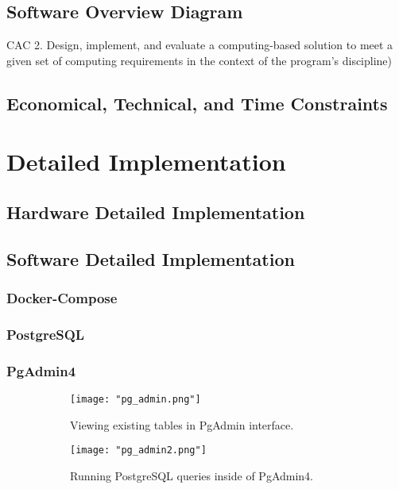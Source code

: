 \documentclass{article}
\begin{document}
\subsection{Software Overview Diagram} 
CAC 2. Design, implement, and evaluate a 
    computing-based solution to meet a given set of computing requirements in the 
    context of the program’s discipline) 

\subsection{Economical, Technical, and Time Constraints}  

\section{Detailed Implementation} 

\subsection{Hardware Detailed Implementation}

\subsection{Software Detailed Implementation}
\subsubsection{Docker-Compose}
\subsubsection{PostgreSQL}
\subsubsection{PgAdmin4}
\begin{figure}[h!]
    \centering
    \begin{subfigure}[b]{.45\textwidth}
        \centering
        \texttt{[image: "pg\_admin.png"]}
        \caption{Viewing existing tables in PgAdmin interface.}
        \label{fig:pg_admin_tables}
    \end{subfigure}
    \begin{subfigure}[b]{.45\textwidth}
        \centering
        \texttt{[image: "pg\_admin2.png"]}
        \caption{Running PostgreSQL queries inside of PgAdmin4.}
        \label{fig:pg_admin_queries}
    \end{subfigure}
    \caption{}
    \label{fig:pg_admin_figs}
\end{figure}
\end{document}
